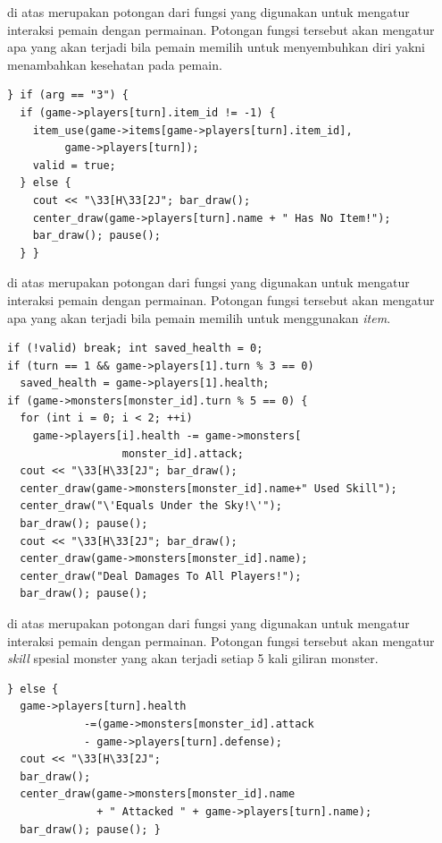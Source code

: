 \documentclass[../main.tex]{subfiles}
\begin{document}
{\Script} di atas merupakan potongan dari fungsi  yang digunakan untuk mengatur interaksi pemain dengan permainan. Potongan fungsi tersebut akan mengatur apa yang akan terjadi bila pemain memilih untuk menyembuhkan diri yakni menambahkan  kesehatan pada pemain.

\begin{code}
\begin{verbatim}
} if (arg == "3") {
  if (game->players[turn].item_id != -1) {
    item_use(game->items[game->players[turn].item_id],
         game->players[turn]);
    valid = true;
  } else {
    cout << "\33[H\33[2J"; bar_draw();
    center_draw(game->players[turn].name + " Has No Item!");
    bar_draw(); pause();
  } }
\end{verbatim}
\end{code}

{\Script} di atas merupakan potongan dari fungsi  yang digunakan untuk mengatur interaksi pemain dengan permainan. Potongan fungsi tersebut akan mengatur apa yang akan terjadi bila pemain memilih untuk menggunakan \textit{item}.

\begin{code}
\begin{verbatim}
if (!valid) break; int saved_health = 0;
if (turn == 1 && game->players[1].turn % 3 == 0)
  saved_health = game->players[1].health;
if (game->monsters[monster_id].turn % 5 == 0) {
  for (int i = 0; i < 2; ++i)
    game->players[i].health -= game->monsters[
                  monster_id].attack;
  cout << "\33[H\33[2J"; bar_draw();
  center_draw(game->monsters[monster_id].name+" Used Skill");
  center_draw("\'Equals Under the Sky!\'");
  bar_draw(); pause();
  cout << "\33[H\33[2J"; bar_draw();
  center_draw(game->monsters[monster_id].name);
  center_draw("Deal Damages To All Players!");
  bar_draw(); pause();
\end{verbatim}
\end{code}

{\Script} di atas merupakan potongan dari fungsi  yang digunakan untuk mengatur interaksi pemain dengan permainan. Potongan fungsi tersebut akan mengatur \textit{skill} spesial monster yang akan terjadi setiap 5 kali giliran monster.

\begin{code}
\begin{verbatim}
} else {
  game->players[turn].health
            -=(game->monsters[monster_id].attack
            - game->players[turn].defense);
  cout << "\33[H\33[2J";
  bar_draw();
  center_draw(game->monsters[monster_id].name
              + " Attacked " + game->players[turn].name);
  bar_draw(); pause(); }
\end{verbatim}
\end{code}
\end{document}
